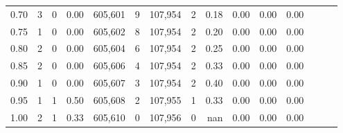 \begin{tabular}{rrrrrrrrrrrrrrr}
0.70 &        3 &       0 &  0.00 &  605,601 &        9 &  107,954 &        2 &  0.18 &  0.00 &  0.00 &      0.00 \\
0.75 &        1 &       0 &  0.00 &  605,602 &        8 &  107,954 &        2 &  0.20 &  0.00 &  0.00 &      0.00 \\
0.80 &        2 &       0 &  0.00 &  605,604 &        6 &  107,954 &        2 &  0.25 &  0.00 &  0.00 &      0.00 \\
0.85 &        2 &       0 &  0.00 &  605,606 &        4 &  107,954 &        2 &  0.33 &  0.00 &  0.00 &      0.00 \\
0.90 &        1 &       0 &  0.00 &  605,607 &        3 &  107,954 &        2 &  0.40 &  0.00 &  0.00 &      0.00 \\
0.95 &        1 &       1 &  0.50 &  605,608 &        2 &  107,955 &        1 &  0.33 &  0.00 &  0.00 &      0.00 \\
1.00 &        2 &       1 &  0.33 &  605,610 &        0 &  107,956 &        0 &   nan &  0.00 &  0.00 &      0.00 \\
\bottomrule
\end{tabular}
